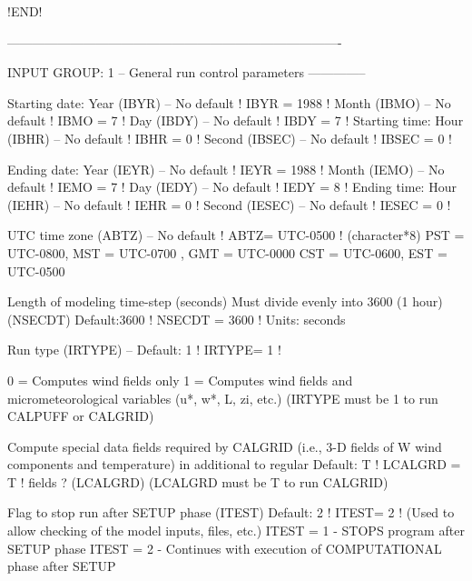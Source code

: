 \documentclass[a4paper,10pt]{article}
\begin{document}
                         !END!


-------------------------------------------------------------------------------

INPUT GROUP: 1 -- General run control parameters
--------------

     Starting date:    Year   (IBYR)  --    No default   ! IBYR  =  1988  !
                       Month  (IBMO)  --    No default   ! IBMO  =  7  !
                       Day    (IBDY)  --    No default   ! IBDY  =  7  !
     Starting time:    Hour   (IBHR)  --    No default   ! IBHR  =  0  !
                       Second (IBSEC) --    No default   ! IBSEC =  0  !

     Ending date:      Year   (IEYR)  --    No default   ! IEYR  =  1988  !
                       Month  (IEMO)  --    No default   ! IEMO  =  7  !
                       Day    (IEDY)  --    No default   ! IEDY  =  8  !
     Ending time:      Hour   (IEHR)  --    No default   ! IEHR  =  0  !
                       Second (IESEC) --    No default   ! IESEC =  0  !

      UTC time zone         (ABTZ) -- No default       ! ABTZ= UTC-0500 !
         (character*8)
         PST = UTC-0800, MST = UTC-0700 , GMT = UTC-0000
         CST = UTC-0600, EST = UTC-0500

     Length of modeling time-step (seconds)
     Must divide evenly into 3600 (1 hour)
     (NSECDT)                        Default:3600     ! NSECDT =  3600  !
                                     Units: seconds

     Run type            (IRTYPE) -- Default: 1       ! IRTYPE=  1  !

        0 = Computes wind fields only
        1 = Computes wind fields and micrometeorological variables
            (u*, w*, L, zi, etc.)
        (IRTYPE must be 1 to run CALPUFF or CALGRID)

     Compute special data fields required
     by CALGRID (i.e., 3-D fields of W wind
     components and temperature)
     in additional to regular            Default: T    ! LCALGRD = T !
     fields ? (LCALGRD)
     (LCALGRD must be T to run CALGRID)

      Flag to stop run after
      SETUP phase (ITEST)             Default: 2       ! ITEST=  2   !
      (Used to allow checking
      of the model inputs, files, etc.)
      ITEST = 1 - STOPS program after SETUP phase
      ITEST = 2 - Continues with execution of
                  COMPUTATIONAL phase after SETUP
\end{document}
